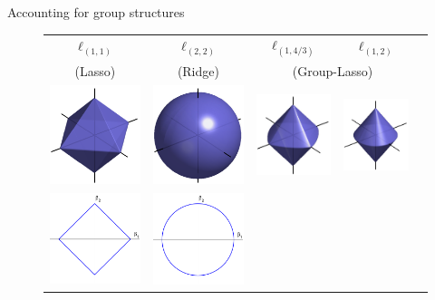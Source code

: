 \documentclass{beamer}\usepackage[]{graphicx}\usepackage[]{color}
\begin{document}
\begin{frame}{Accounting for group structures}
  \vspace{-.25cm}
  \begin{figure}[htbp!]
    \centering
    \begin{tabular}{@{}ccccc@{}}
      $\ell_{(1,1)}$    &    $\ell_{(2,2)}$   &    $\ell_{(1,4/3)}$    &
      $\ell_{(1,2)}$ \\[1.5ex]
      (Lasso) & (Ridge) & \multicolumn{2}{c}{(Group-Lasso)} & \\ 
      \includegraphics[width=.175\textwidth]{figures/norms_marie/lasso} &
      \includegraphics[width=.175\textwidth]{figures/norms_marie/ridge3D} &
      \includegraphics[width=.175\textwidth]{figures/norms_marie/hierarchical3D} & 
      \includegraphics[width=.175\textwidth]{figures/norms_marie/grouplasso3D} \\
      \includegraphics[width=.175\textwidth]{figures/norms_marie/lasso2D} &
      \includegraphics[width=.175\textwidth]{figures/norms_marie/ridge2D} &

\end{tabular}
\end{figure}
\end{frame}
\end{document}
